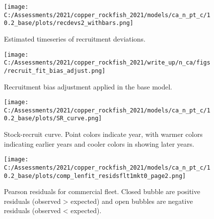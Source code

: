 \documentclass[11pt,
  english,
  a4paper,
]{article}
\begin{document}

\begin{figure}
\centering
\texttt{[image: C:/Assessments/2021/copper\_rockfish\_2021/models/ca\_n\_pt\_c/10.2\_base/plots/recdevs2\_withbars.png]}
\caption{Estimated timeseries of recruitment deviations.\label{fig:rec-devs}}
\end{figure}

\tagmcend\tagstructend


\begin{figure}
\centering
\texttt{[image: C:/Assessments/2021/copper\_rockfish\_2021/write\_up/n\_ca/figs/recruit\_fit\_bias\_adjust.png]}
\caption{Recruitment bias adjustment applied in the base model.\label{fig:bias-adj}}
\end{figure}

\tagmcend\tagstructend


\begin{figure}
\centering
\texttt{[image: C:/Assessments/2021/copper\_rockfish\_2021/models/ca\_n\_pt\_c/10.2\_base/plots/SR\_curve.png]}
\caption{Stock-recruit curve. Point colors indicate year, with warmer colors indicating earlier years and cooler colors in showing later years.\label{fig:bh-curve}}
\end{figure}

\tagmcend\tagstructend


\begin{figure}
\centering
\texttt{[image: C:/Assessments/2021/copper\_rockfish\_2021/models/ca\_n\_pt\_c/10.2\_base/plots/comp\_lenfit\_residsflt1mkt0\_page2.png]}
\caption{Pearson residuals for commercial fleet. Closed bubble are positive residuals (observed \textgreater{} expected) and open bubbles are negative residuals (observed \textless{} expected).\label{fig:com-pearson}}
\end{figure}
\end{document}
